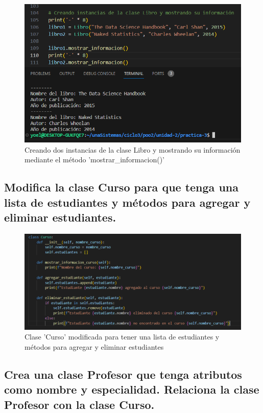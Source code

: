 \documentclass[11pt,a4paper]{article}
\begin{document}
\begin{figure}[H]
    \centering
    \includegraphics[width=0.7\linewidth]{images/12-1.png}
    \caption{Creando dos instancias de la clase Libro y mostrando su información mediante el método 'mostrar\_informacion()'}
    \label{fig:enter-label}
\end{figure}

\subsection{Modifica la clase Curso para que tenga una lista de estudiantes y métodos para agregar y eliminar estudiantes.}

\begin{figure}[H]
    \centering
    \includegraphics[width=1\linewidth]{images/13.png}
    \caption{Clase 'Curso' modificada para tener una lista de estudiantes y métodos para agregar y eliminar estudiantes}
    \label{fig:enter-label}
\end{figure}

\subsection{Crea una clase Profesor que tenga atributos como nombre y especialidad. Relaciona la clase Profesor con la clase Curso.}
\end{document}
